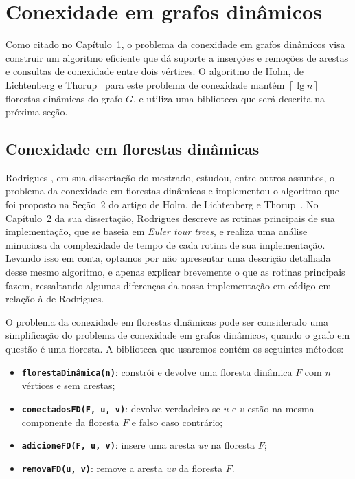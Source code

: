 

\chapter{Conexidade em grafos dinâmicos}

\enlargethispage{.8\baselineskip}

Como citado no Capítulo~1, o problema da conexidade em grafos dinâmicos visa construir um algoritmo eficiente que dá suporte a inserções e remoções de arestas e consultas de conexidade entre dois vértices. O algoritmo de Holm, de Lichtenberg e Thorup~\cite{jacob_holm} para este problema de conexidade mantém $\left\lceil \lg n \right\rceil$ florestas dinâmicas do grafo $G$, e utiliza uma biblioteca que será descrita na próxima seção. 

\section{Conexidade em florestas dinâmicas}
\label{sec:dynamic-forest-connectivity}

Rodrigues \cite{arthur}, em sua dissertação do mestrado, estudou, entre outros assuntos, o problema da conexidade em florestas dinâmicas e implementou o algoritmo que foi proposto na Seção~2 do artigo de Holm, de Lichtenberg e Thorup~\cite{jacob_holm}. No Capítulo~2 da sua dissertação, Rodrigues descreve as rotinas principais de sua implementação, que se baseia em \textit{Euler tour trees}, e realiza uma análise minuciosa da complexidade de tempo de cada rotina de sua implementação. Levando isso em conta, optamos por não apresentar uma descrição detalhada desse mesmo algoritmo, e apenas explicar brevemente o que as rotinas principais fazem, ressaltando algumas diferenças da nossa implementação em código em relação à de Rodrigues.  

O problema da conexidade em florestas dinâmicas pode ser considerado uma simplificação do problema de conexidade em grafos dinâmicos, quando o grafo em questão é uma floresta. A biblioteca que usaremos contém os seguintes métodos:

\begin{itemize}
    \item \texttt{\textbf{florestaDinâmica(n)}}: constrói e devolve uma floresta dinâmica $F$ com $n$ vértices e sem arestas;
    \item \texttt{\textbf{conectadosFD(F, u, v)}}: devolve verdadeiro se \textit{$u$} e \textit{$v$} estão na mesma componente da floresta $F$ e falso caso contrário;
    \item \texttt{\textbf{adicioneFD(F, u, v)}}: insere uma aresta \textit{uv} na floresta $F$;
    \item \texttt{\textbf{removaFD(u, v)}}: remove a aresta \textit{uv} da floresta $F$.
\end{itemize}


